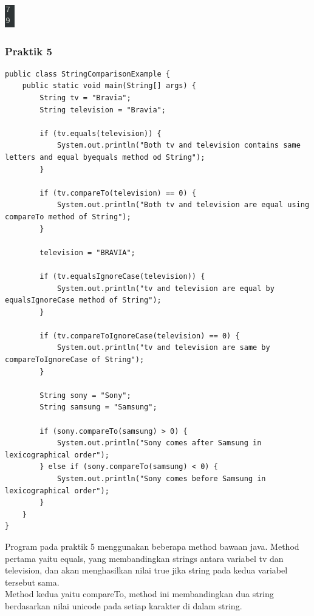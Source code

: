 \documentclass[a4paper,12pt]{article}
\begin{document}
\begin{center}
    \includegraphics[scale=1]{4.png} 
\end{center}


\subsubsection{Praktik 5}
\begin{lstlisting}
public class StringComparisonExample {
    public static void main(String[] args) {
        String tv = "Bravia";
        String television = "Bravia";

        if (tv.equals(television)) {
            System.out.println("Both tv and television contains same letters and equal byequals method od String");
        }

        if (tv.compareTo(television) == 0) {
            System.out.println("Both tv and television are equal using compareTo method of String");
        }

        television = "BRAVIA";

        if (tv.equalsIgnoreCase(television)) {
            System.out.println("tv and television are equal by equalsIgnoreCase method of String");
        }

        if (tv.compareToIgnoreCase(television) == 0) {
            System.out.println("tv and television are same by compareToIgnoreCase of String");
        }

        String sony = "Sony";
        String samsung = "Samsung";

        if (sony.compareTo(samsung) > 0) {
            System.out.println("Sony comes after Samsung in lexicographical order");
        } else if (sony.compareTo(samsung) < 0) {
            System.out.println("Sony comes before Samsung in lexicographical order");
        }
    }
}
\end{lstlisting}

Program pada praktik 5 menggunakan beberapa method bawaan java. Method pertama yaitu equals, yang membandingkan strings
antara variabel tv dan television, dan akan menghasilkan nilai true jika string pada kedua variabel tersebut sama.\\

Method kedua yaitu compareTo, method ini membandingkan dua string berdasarkan nilai unicode pada setiap karakter di
dalam string.\\
\end{document}
